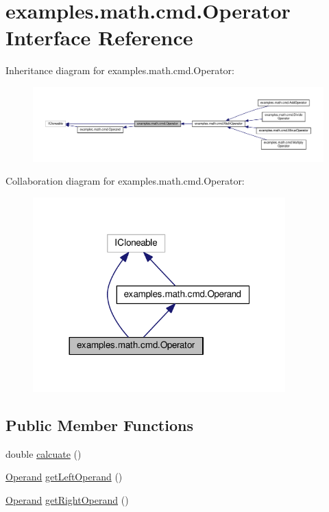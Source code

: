 \hypertarget{interfaceexamples_1_1math_1_1cmd_1_1_operator}{\section{examples.\-math.\-cmd.\-Operator Interface Reference}
\label{interfaceexamples_1_1math_1_1cmd_1_1_operator}
}


Inheritance diagram for examples.\-math.\-cmd.\-Operator\-:
\nopagebreak
\begin{figure}[H]
\begin{center}
\leavevmode
\includegraphics[width=350pt]{interfaceexamples_1_1math_1_1cmd_1_1_operator__inherit__graph}
\end{center}
\end{figure}


Collaboration diagram for examples.\-math.\-cmd.\-Operator\-:
\nopagebreak
\begin{figure}[H]
\begin{center}
\leavevmode
\includegraphics[width=276pt]{interfaceexamples_1_1math_1_1cmd_1_1_operator__coll__graph}
\end{center}
\end{figure}
\subsection*{Public Member Functions}
\begin{DoxyCompactItemize}
\item 
double \hyperlink{interfaceexamples_1_1math_1_1cmd_1_1_operator_a2498fd5b2a244bf2e63bc2613dc49e96}{calcuate} ()
\item 
\hyperlink{interfaceexamples_1_1math_1_1cmd_1_1_operand}{Operand} \hyperlink{interfaceexamples_1_1math_1_1cmd_1_1_operator_acd2737e0e2fa4cb2e3199b68e89bc540}{get\-Left\-Operand} ()
\item 
\hyperlink{interfaceexamples_1_1math_1_1cmd_1_1_operand}{Operand} \hyperlink{interfaceexamples_1_1math_1_1cmd_1_1_operator_a9475decb7446aa496fafa921d6c86d01}{get\-Right\-Operand} ()
\end{DoxyCompactItemize}
